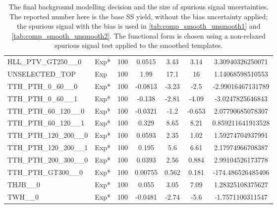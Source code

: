 \begin{table}[!h]
{\begin{tabular}{llccccS[table-format = 3.2, round-mode = places, round-precision = 2]}
 HLL\_PTV\_GT250\_\_0 &Exp*&100&0.0515&3.43&3.14&3.30940326250071\\
 UNSELECTED\_TOP &Exp&100&1.99&17.1&16&1.14068598510553\\
 TTH\_PTH\_0\_60\_\_0 &Exp*&100&-0.0813&-3.23&-2.5&-2.99016467131789\\
 TTH\_PTH\_0\_60\_\_1 &Exp*&100&-0.138&-2.81&-4.09&-3.0247825646843\\
 TTH\_PTH\_60\_120\_\_0 &Exp*&100&-0.0321&-1.2&-0.653&2.07790685078307\\
 TTH\_PTH\_60\_120\_\_1 &Exp*&100&0.329&8.65&8.21&0.859211641913528\\
 TTH\_PTH\_120\_200\_\_0 &Exp*&100&0.0593&2.35&1.02&1.59274704937991\\
 TTH\_PTH\_120\_200\_\_1 &Exp*&100&0.195&5.6&6.61&2.17974966708387\\
 TTH\_PTH\_200\_300\_\_0 &Exp*&100&0.0393&2.56&0.884&2.99104526173778\\
 TTH\_PTH\_GT300\_\_0 &Exp*&100&0.00755&0.562&0.181&-174.486526485406\\
 THJB\_\_0 &Exp*&100&0.055&3.05&7.09&1.28325108375627\\
 TWH\_\_0 &Exp*&100&-0.0481&-2.74&-5.6&-1.7571100311547\\
       \hline
      \hline
      \end{tabular}
}
      \caption{
The final background modelling decision and the size of spurious signal uncertainties. The reported number here is the base SS yield, without the bias uncertainty applied; the spurious signal with the bias is used in \ref{tab:comp_smooth_unsmooth1} and \ref{tab:comp_smooth_unsmooth2}. The functional form is chosen using a non-relaxed spurious signal test applied to the smoothed templates.
   \label{tab:spurious_sig_gptight2}   }   
\end{table}

